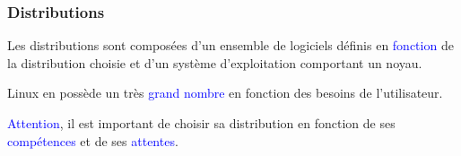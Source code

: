 \documentclass[aspectratio=169]{beamer}
\begin{document}
\begin{frame}
\frametitle{Distributions}
Les distributions sont composées d'un ensemble de logiciels définis en
\textcolor{blue}{fonction} de la distribution choisie et d'un système
d'exploitation comportant un noyau.

\hspace{0.5cm}

Linux en possède un très \textcolor{blue}{grand nombre} en fonction des besoins
de l'utilisateur.

\hspace{0.5cm}

\textcolor{blue}{Attention}, il est important de choisir sa distribution en
fonction de ses \textcolor{blue}{compétences} et de ses
\textcolor{blue}{attentes}.

\hspace{0.5cm}

\end{frame}
\end{document}
